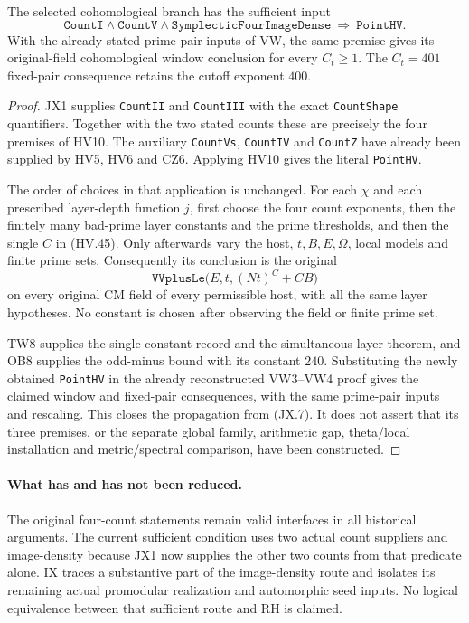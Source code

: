 \begin{corollary}
\label{claim:JX2}
The selected cohomological branch has the sufficient input
\[
 \texttt{CountI}\wedge\texttt{CountV}
      \wedge\texttt{SymplecticFourImageDense}
                     \ \Longrightarrow\ \texttt{PointHV}.
                                                               \tag{JX.7}
\]
With the already stated prime-pair inputs of VW,
the same premise gives its original-field cohomological
window conclusion for every $C_t\ge1$.  The
$C_t=401$ fixed-pair consequence retains the cutoff
exponent $400$.
\end{corollary}
\begin{proof}
JX1 supplies \texttt{CountII} and \texttt{CountIII}
with the exact \texttt{CountShape} quantifiers.
Together with the two stated counts these are
precisely the four premises of HV10.
The auxiliary \texttt{CountVs}, \texttt{CountIV}
and \texttt{CountZ} have already been supplied
by HV5, HV6 and CZ6.  Applying HV10 gives the
literal \texttt{PointHV}.

The order of choices in that application is
unchanged.  For each $\chi$ and each prescribed
layer-depth function $j$, first choose the four
count exponents, then the finitely many
bad-prime layer constants and the prime
thresholds, and then the single $C$ in (HV.45).
Only afterwards vary the host, $t,B,E,\Omega$,
local models and finite prime sets.
Consequently its conclusion is the original
\[
  \texttt{VVplusLe}\bigl(E,t,(Nt)^C+CB\bigr)
                                                               \tag{JX.8}
\]
on every original CM field of every permissible
host, with all the same layer hypotheses.
No constant is chosen after observing the field
or finite prime set.

TW8 supplies the single constant record and the
simultaneous layer theorem, and OB8 supplies the
odd-minus bound with its constant $240$.
Substituting the newly obtained \texttt{PointHV}
in the already reconstructed VW3--VW4 proof gives
the claimed window and fixed-pair consequences,
with the same prime-pair inputs and rescaling.
This closes the propagation from (JX.7).
It does not assert that its three premises, or
the separate global family, arithmetic gap,
theta/local installation and metric/spectral
comparison, have been constructed.
\end{proof}

\paragraph{What has and has not been reduced.}
The original four-count statements remain valid
interfaces in all historical arguments.  The
current sufficient condition uses two actual
count suppliers and image-density because JX1
now supplies the other two counts from that
predicate alone.  IX traces a substantive part
of the image-density route and isolates its
remaining actual promodular realization and
automorphic seed inputs.  No logical equivalence
between that sufficient route and RH is claimed.
